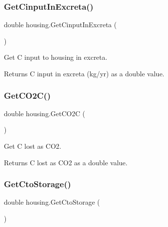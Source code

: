 \subsubsection{\texorpdfstring{GetCinputInExcreta()}{GetCinputInExcreta()}}
{\footnotesize\ttfamily double housing.\+Get\+Cinput\+In\+Excreta (\begin{DoxyParamCaption}{ }\end{DoxyParamCaption})\hspace{0.3cm}{\ttfamily [inline]}}



Get C input to housing in excreta. 

\begin{DoxyReturn}{Returns}
C input in excreta (kg/yr) as a double value. 
\end{DoxyReturn}
\mbox{\label{classhousing_ac6b99e9bf54af3c08b8cf0b6ba63c6f2}} 
\subsubsection{\texorpdfstring{GetCO2C()}{GetCO2C()}}
{\footnotesize\ttfamily double housing.\+Get\+C\+O2C (\begin{DoxyParamCaption}{ }\end{DoxyParamCaption})\hspace{0.3cm}{\ttfamily [inline]}}



Get C lost as C\+O2. 

\begin{DoxyReturn}{Returns}
C lost as C\+O2 as a double value. 
\end{DoxyReturn}
\mbox{\label{classhousing_ad26e09572df342d9e0b17400f24720ef}} 
\subsubsection{\texorpdfstring{GetCtoStorage()}{GetCtoStorage()}}
{\footnotesize\ttfamily double housing.\+Get\+Cto\+Storage (\begin{DoxyParamCaption}{ }\end{DoxyParamCaption})\hspace{0.3cm}{\ttfamily [inline]}}



